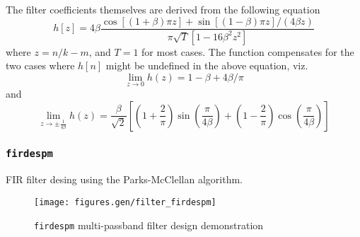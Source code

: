 The filter coefficients themselves are derived from the following equation
\[ 
    h\left[z\right] =
      4\beta \frac{ \cos\left[(1+\beta)\pi z\right] +
                    \sin\left[(1-\beta)\pi z\right] / (4\beta z) }
                  { \pi \sqrt{T}\left[ 1-16\beta^2z^2\right] }
\]
where $z=n/k-m$, and $T=1$ for most cases.
The function compensates for the two cases where $h[n]$ might be
undefined in the above equation, viz.
\[
    \mathop {\lim }\limits_{z \to 0 } h(z) = 1 - \beta + 4\beta/\pi
\]
and
\[
    \mathop {\lim }\limits_{z \to \pm \frac{1}{4\beta} } h(z) =
        \frac{\beta}{\sqrt{2}}
        \left[
            \left(1 + \frac{2}{\pi}\right)\sin\left(\frac{\pi}{4\beta}\right) +
            \left(1 - \frac{2}{\pi}\right)\cos\left(\frac{\pi}{4\beta}\right)
        \right]
\]


\subsubsection{{\tt firdespm}}
FIR filter desing using the Parks-McClellan algorithm.

\begin{figure}
\centering
  \texttt{[image: figures.gen/filter\_firdespm]}
\caption{{\tt firdespm} multi-passband filter design demonstration}
\label{fig:module:filter:firdespm}
\end{figure}


